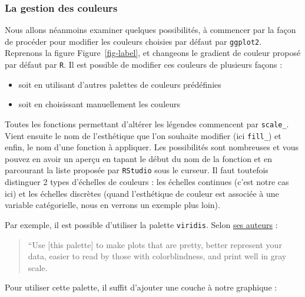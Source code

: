\documentclass[
  letterpaper,
  DIV=11,
  numbers=noendperiod]{scrreprt}
\providecommand{\tightlist}{%
  \setlength{\itemsep}{0pt}\setlength{\parskip}{0pt}}\usepackage{longtable,booktabs,array}
\begin{document}
\hypertarget{la-gestion-des-couleurs}{%
\subsubsection{La gestion des couleurs}\label{la-gestion-des-couleurs}}

Nous allons néanmoins examiner quelques possibilités, à commencer par la
façon de procéder pour modifier les couleurs choisies par défaut par
\texttt{ggplot2}. Reprenons la figure Figure~\ref{fig-label}, et
changeons le gradient de couleur proposé par défaut par \texttt{R}. Il
est possible de modifier ces couleurs de plusieurs façons :

\begin{itemize}
\tightlist
\item
  soit en utilisant d'autres palettes de couleurs prédéfinies
\item
  soit en choisissant manuellement les couleurs
\end{itemize}

Toutes les fonctions permettant d'altérer les légendes commencent par
\texttt{scale\_}. Vient ensuite le nom de l'esthétique que l'on souhaite
modifier (ici \texttt{fill\_}) et enfin, le nom d'une fonction à
appliquer. Les possibilités sont nombreuses et vous pouvez en avoir un
aperçu en tapant le début du nom de la fonction et en parcourant la
liste proposée par \texttt{RStudio} sous le curseur. Il faut toutefois
distinguer 2 types d'échelles de couleurs : les échelles continues
(c'est notre cas ici) et les échelles discrètes (quand l'esthétique de
couleur est associée à une variable catégorielle, nous en verrons un
exemple plus loin).

Par exemple, il est possible d'utiliser la palette \texttt{viridis}.
Selon
\href{https://cran.r-project.org/web/packages/viridis/vignettes/intro-to-viridis.html}{ses
auteurs} :

\begin{quote}
``Use {[}this palette{]} to make plots that are pretty, better represent
your data, easier to read by those with colorblindness, and print well
in gray scale.
\end{quote}

Pour utiliser cette palette, il suffit d'ajouter une couche à notre
graphique :
\end{document}
